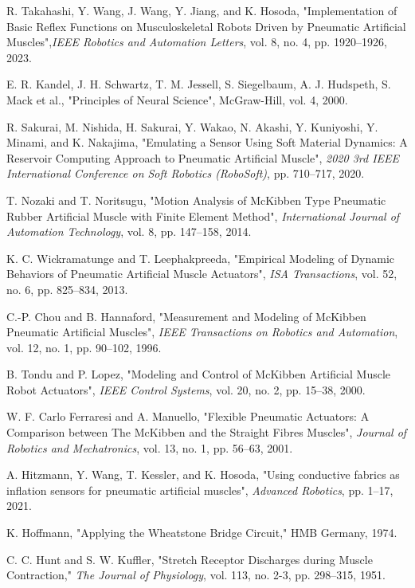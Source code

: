 \documentclass[letterpaper, 10 pt, conference]{IEEEconf}
\begin{document}
\begin{thebibliography}{99}
     R. Takahashi, Y. Wang, J. Wang, Y. Jiang, and K. Hosoda, "Implementation of Basic Reflex Functions on Musculoskeletal Robots Driven by Pneumatic Artificial Muscles",\textit{IEEE Robotics and Automation Letters}, vol. 8, no. 4, pp. 1920--1926, 2023.
    
     E. R. Kandel, J. H. Schwartz, T. M. Jessell, S. Siegelbaum, A. J. Hudspeth, S. Mack et al., "Principles of Neural Science", McGraw-Hill, vol. 4, 2000.
    
     R. Sakurai, M. Nishida, H. Sakurai, Y. Wakao, N. Akashi, Y. Kuniyoshi, Y. Minami, and K. Nakajima, "Emulating a Sensor Using Soft Material Dynamics: A Reservoir Computing Approach to Pneumatic Artificial Muscle", \textit{2020 3rd IEEE International Conference on Soft Robotics (RoboSoft)}, pp. 710--717, 2020.
    
     T. Nozaki and T. Noritsugu, "Motion Analysis of McKibben Type Pneumatic Rubber Artificial Muscle with Finite Element Method", \textit{International Journal of Automation Technology}, vol. 8, pp. 147--158, 2014.
    
     K. C. Wickramatunge and T. Leephakpreeda, "Empirical Modeling of Dynamic Behaviors of Pneumatic Artificial Muscle Actuators", \textit{ISA Transactions}, vol. 52, no. 6, pp. 825--834, 2013.
    
     C.-P. Chou and B. Hannaford, "Measurement and Modeling of McKibben Pneumatic Artificial Muscles", \textit{IEEE Transactions on Robotics and Automation}, vol. 12, no. 1, pp. 90--102, 1996.
    
     B. Tondu and P. Lopez, "Modeling and Control of McKibben Artificial Muscle Robot Actuators", \textit{IEEE Control Systems}, vol. 20, no. 2, pp. 15--38, 2000.
    
     W. F. Carlo Ferraresi and A. Manuello, "Flexible Pneumatic Actuators: A Comparison between The McKibben and the Straight Fibres Muscles", \textit{Journal of Robotics and Mechatronics}, vol. 13, no. 1, pp. 56--63, 2001.

     A. Hitzmann, Y. Wang, T. Kessler, and K. Hosoda, "Using conductive fabrics as inflation sensors for pneumatic artificial muscles", \textit{Advanced Robotics}, pp. 1--17, 2021.


     K. Hoffmann, "Applying the Wheatstone Bridge Circuit," HMB Germany, 1974.

     C. C. Hunt and S. W. Kuffler, "Stretch Receptor Discharges during Muscle Contraction," \textit{The Journal of Physiology}, vol. 113, no. 2-3, pp. 298--315, 1951.


  
    
    \end{thebibliography}
    

    
\end{document}
